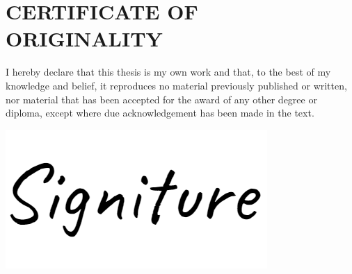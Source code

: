 \chapter*{\MakeUppercase{Certificate of Originality}}
\label{chap::certificateoforiginality}

I hereby declare that this thesis is my own work and that, to the best of my knowledge and belief, it reproduces no material previously published or written, nor material that has been accepted for the award of any other degree or diploma, except where due acknowledgement has been made in the text.

\vspace{1cm}
\hfill\includegraphics[keepaspectratio=true, width=0.15\pdfpagewidth]{images/template/signature.png}

{\large \hfill \authorname \par}\vspace{0.5cm}